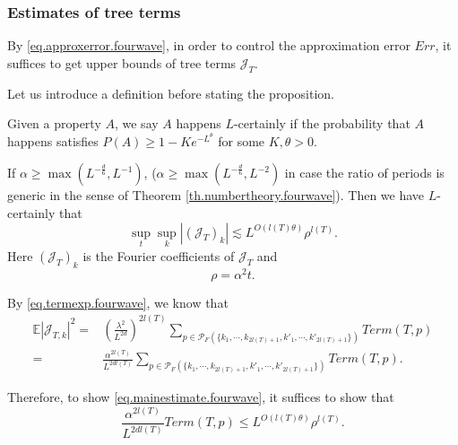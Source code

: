 \subsubsection{Estimates of tree terms} By \eqref{eq.approxerror.fourwave}, in order to control the approximation error $Err$, it suffices to get upper bounds of tree terms $\mathcal{J}_T$.

Let us introduce a definition before stating the proposition.

\begin{defn}
Given a property $A$, we say $A$ happens $L$-certainly if the probability that $A$ happens satisfies $P(A)\ge 1-Ke^{-L^\theta}$ for some $K, \theta>0$.
\end{defn}

\begin{prop}\label{prop.treetermsupperbound.fourwave}
If $\alpha \ge \max(L^{-\frac{d}{6}},L^{-1})$, ($\alpha \ge \max(L^{-\frac{d}{6}},L^{-2})$ in case the ratio of periods is generic in the sense of Theorem \ref{th.numbertheory.fourwave}). Then we have $L$-certainly that 
\begin{equation}\label{eq.mainestimate.fourwave}
 \sup_t\sup_k |(\mathcal{J}_T)_k|\lesssim L^{O(l(T)\theta)} \rho^{l(T)}.
\end{equation}
Here $(\mathcal{J}_T)_k$ is the Fourier coefficients of $\mathcal{J}_T$ and 
\begin{equation}
 \rho=\alpha^{2}t.
 \end{equation}
\end{prop}

By \eqref{eq.termexp.fourwave}, we know that 
\begin{equation}
 \begin{split}
 \mathbb{E}|\mathcal{J}_{T,k}|^2=&\left(\frac{\lambda^2}{L^{2d}}\right)^{2l(T)}
 \sum_{p\in \mathcal{P}_F(\{k_1,\cdots, k_{2l(T)+1}, k'_1,\cdots, k'_{2l(T)+1}\})} Term(T, p)
 \\
 =&\frac{\alpha^{2l(T)}}{L^{2dl(T)}}
 \sum_{p\in \mathcal{P}_F(\{k_1,\cdots, k_{2l(T)+1}, k'_1,\cdots, k'_{2l(T)+1}\})} Term(T, p).
 \end{split}
\end{equation}

Therefore, to show \eqref{eq.mainestimate.fourwave}, it suffices to show that 
\begin{equation}\label{eq.orderterm'.fourwave}
 \frac{\alpha^{2l(T)}}{L^{2dl(T)}}Term(T, p)\le L^{O(l(T)\theta)} \rho^{l(T)}.
\end{equation}

